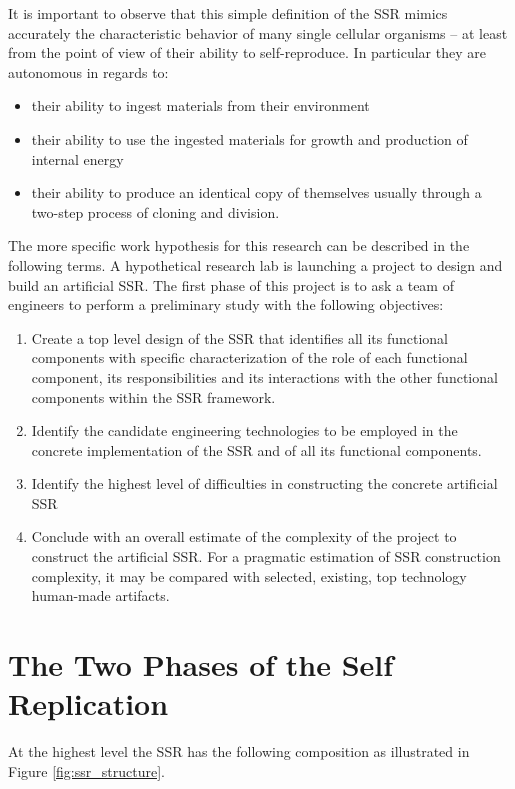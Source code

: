 It is important to observe that this simple definition of the SSR mimics
accurately the characteristic behavior of many single cellular
organisms – at least from the point of view of their ability to
self-reproduce. In particular they are autonomous in regards to:

\begin{itemize}
\item their ability to ingest materials from their environment
\item their ability to use the ingested materials for growth and
production of internal energy
\item their ability to produce an identical copy of themselves usually
through a two-step process of cloning and division.
\end{itemize}

The more specific work hypothesis for this research can be described in
the following terms. A hypothetical research lab is launching a project
to design and build an artificial SSR. The first phase of this project
is to ask a team of engineers to perform a preliminary study with the
following objectives:

\begin{enumerate}
\item  Create a top level design of the SSR that identifies all its
functional components with specific characterization of the role of
each functional component, its responsibilities and its interactions
with the other functional components within the SSR framework.
\item  Identify the candidate engineering technologies to be employed in
the concrete implementation of the SSR and of all its functional
components.
\item  Identify the highest level of difficulties in constructing the
concrete artificial SSR
\item  Conclude with an overall estimate of the complexity of the
project to construct the artificial SSR. For a pragmatic estimation of
SSR construction complexity, it may be compared with selected,
existing, top technology human-made artifacts.
\end{enumerate}

\section{The Two Phases of the Self Replication}

At the highest level the SSR has the following composition as
illustrated in Figure \ref{fig:ssr_structure}.


